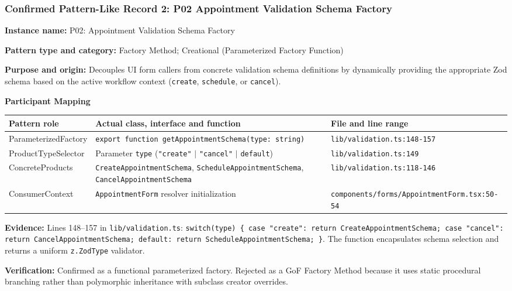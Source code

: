 \documentclass[11pt,a4paper]{article}
\newcommand{\entry}[2]{\textbf{#1:} #2\par}
\begin{document}
\subsubsection{Confirmed Pattern-Like Record 2: P02 Appointment Validation Schema Factory}
\entry{Instance name}{P02: Appointment Validation Schema Factory}
\entry{Pattern type and category}{Factory Method; Creational (Parameterized Factory Function)}
\entry{Purpose and origin}{Decouples UI form callers from concrete validation schema definitions by dynamically providing the appropriate Zod schema based on the active workflow context (\texttt{create}, \texttt{schedule}, or \texttt{cancel}).}
\textbf{Participant Mapping}\par
\begin{tabularx}{\linewidth}{@{}p{32mm}Xp{50mm}@{}}\toprule
Pattern role & Actual class, interface and function & File and line range\\\midrule
ParameterizedFactory & \texttt{export function getAppointmentSchema(type: string)} & \texttt{lib/validation.ts:148-157}\\
ProductTypeSelector & Parameter \texttt{type} (\texttt{"create"} $\mid$ \texttt{"cancel"} $\mid$ \texttt{default}) & \texttt{lib/validation.ts:149}\\
ConcreteProducts & \texttt{CreateAppointmentSchema}, \texttt{ScheduleAppointmentSchema}, \texttt{CancelAppointmentSchema} & \texttt{lib/validation.ts:118-146}\\
ConsumerContext & \texttt{AppointmentForm} resolver initialization & \texttt{components/forms/AppointmentForm.tsx:50-54}\\\bottomrule
\end{tabularx}
\entry{Evidence}{Lines 148--157 in \texttt{lib/validation.ts}: \texttt{switch(type) \{ case "create": return CreateAppointmentSchema; case "cancel": return CancelAppointmentSchema; default: return ScheduleAppointmentSchema; \}}. The function encapsulates schema selection and returns a uniform \texttt{z.ZodType} validator.}
\entry{Verification}{Confirmed as a functional parameterized factory. Rejected as a GoF Factory Method because it uses static procedural branching rather than polymorphic inheritance with subclass creator overrides.}
\end{document}
